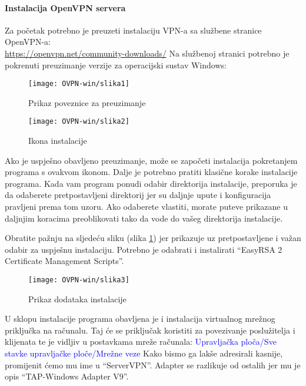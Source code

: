 \paragraph*{Instalacija OpenVPN servera}
\hfill \bigbreak
Za početak potrebno je preuzeti instalaciju VPN-a sa službene stranice OpenVPN-a:\\ \url{https://openvpn.net/community-downloads/}
\hfill \smallbreak
Na službenoj stranici potrebno je pokrenuti preuzimanje verzije za operacijski sustav Windows:
\begin{figure}[h!]
	\centering
     \texttt{[image: OVPN-win/slika1]}
     \caption{Prikaz poveznice za preuzimanje}
\end{figure}
\FloatBarrier
\begin{wrapfigure}{r}{0.4\textwidth}
  \begin{center}
    \texttt{[image: OVPN-win/slika2]}
    \caption{Ikona instalacije}
  \end{center}
\end{wrapfigure}
\FloatBarrier
Ako je uspješno obavljeno preuzimanje, može se započeti instalacija pokretanjem programa s ovakvom ikonom.
\bigbreak
Dalje je potrebno pratiti klasične korake instalacije programa. Kada vam program ponudi odabir direktorija instalacije, preporuka je da odaberete pretpostavljeni direktorij jer su daljnje upute i konfiguracija pravljeni prema tom uzoru. Ako odaberete vlastiti, morate puteve prikazane u daljnjim koracima preoblikovati tako da vode do vašeg direktorija instalacije.
\smallbreak

Obratite pažnju na sljedeću sliku (slika \ref{fig:instalacija-open}) jer prikazuje uz pretpostavljene i važan odabir za uspješnu instalaciju. Potrebno je odabrati i instalirati ``EasyRSA 2 Certificate Management Scripts''.
\begin{figure}[h!]
	\centering
     \texttt{[image: OVPN-win/slika3]}
     \caption{Prikaz dodataka instalacije}
     \label{fig:instalacija-open}
\end{figure}
\FloatBarrier
U sklopu instalacije programa obavljena je i instalacija virtualnog mrežnog priključka na računalu. Taj će se priključak koristiti za povezivanje poslužitelja i klijenata te je vidljiv u postavkama mreže računala:\smallbreak
\small\textcolor{blue}{Upravljačka ploča/Sve stavke upravljačke ploče/Mrežne veze}
\smallbreak
Kako bismo ga lakše adresirali kasnije, promijenit ćemo mu ime u ``ServerVPN''. Adapter se razlikuje od ostalih jer mu je opis ``TAP-Windows Adapter V9''.

